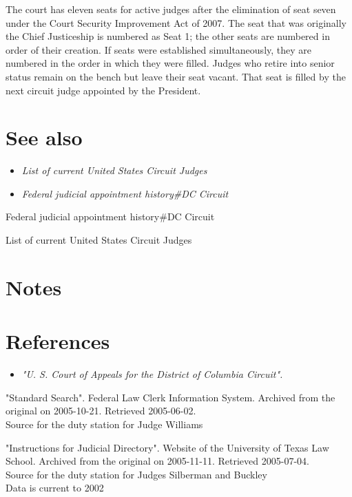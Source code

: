 The court has eleven seats for active judges after the elimination of
seat seven under the Court Security Improvement Act of 2007. The seat
that was originally the Chief Justiceship is numbered as Seat 1; the
other seats are numbered in order of their creation. If seats were
established simultaneously, they are numbered in the order in which they
were filled. Judges who retire into senior status remain on the bench
but leave their seat vacant. That seat is filled by the next circuit
judge appointed by the President.

\section{See also}\label{see-also}

\begin{itemize}
\item
  \emph{List of current United States Circuit Judges}
\item
  \emph{Federal judicial appointment history\#DC Circuit}
\end{itemize}

Federal judicial appointment history\#DC Circuit

List of current United States Circuit Judges

\section{Notes}\label{notes}

\section{References}\label{references}

\begin{itemize}
\item
  \emph{"U. S. Court of Appeals for the District of Columbia Circuit".}
\end{itemize}

"Standard Search". Federal Law Clerk Information System. Archived from
the original on 2005-10-21. Retrieved 2005-06-02.\\
Source for the duty station for Judge Williams

"Instructions for Judicial Directory". Website of the University of
Texas Law School. Archived from the original on 2005-11-11. Retrieved
2005-07-04.\\
Source for the duty station for Judges Silberman and Buckley\\
Data is current to 2002

